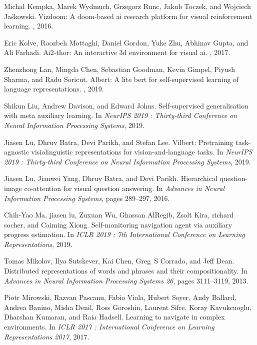 \documentclass[10pt,twocolumn,letterpaper]{article}
\begin{document}
\begin{thebibliography}{10}
	Michał {Kempka}, Marek {Wydmuch}, Grzegorz {Runc}, Jakub {Toczek}, and
	Wojciech {Jaśkowski}.
	\newblock Vizdoom: A doom-based ai research platform for visual reinforcement
	learning.
	, 2016.
	
	Eric {Kolve}, Roozbeh {Mottaghi}, Daniel {Gordon}, Yuke {Zhu}, Abhinav {Gupta},
	and Ali {Farhadi}.
	\newblock Ai2-thor: An interactive 3d environment for visual ai.
	, 2017.
	
	Zhenzhong {Lan}, Mingda {Chen}, Sebastian {Goodman}, Kevin {Gimpel}, Piyush
	{Sharma}, and Radu {Soricut}.
	\newblock Albert: A lite bert for self-supervised learning of language
	representations.
	, 2019.
	
	Shikun {Liu}, Andrew {Davison}, and Edward {Johns}.
	\newblock Self-supervised generalisation with meta auxiliary learning.
	\newblock In {\em NeurIPS 2019 : Thirty-third Conference on Neural Information
		Processing Systems}, 2019.
	
	Jiasen {Lu}, Dhruv {Batra}, Devi {Parikh}, and Stefan {Lee}.
	\newblock Vilbert: Pretraining task-agnostic visiolinguistic representations
	for vision-and-language tasks.
	\newblock In {\em NeurIPS 2019 : Thirty-third Conference on Neural Information
		Processing Systems}, 2019.
	
	Jiasen {Lu}, Jianwei {Yang}, Dhruv {Batra}, and Devi {Parikh}.
	\newblock Hierarchical question-image co-attention for visual question
	answering.
	\newblock In {\em Advances in Neural Information Processing Systems}, pages
	289--297, 2016.
	
	Chih-Yao {Ma}, jiasen {lu}, Zuxuan {Wu}, Ghassan {AlRegib}, Zsolt {Kira},
	richard {socher}, and Caiming {Xiong}.
	\newblock Self-monitoring navigation agent via auxiliary progress estimation.
	\newblock In {\em ICLR 2019 : 7th International Conference on Learning
		Representations}, 2019.
	
	Tomas {Mikolov}, Ilya {Sutskever}, Kai {Chen}, Greg~S {Corrado}, and Jeff
	{Dean}.
	\newblock Distributed representations of words and phrases and their
	compositionality.
	\newblock In {\em Advances in Neural Information Processing Systems 26}, pages
	3111--3119, 2013.
	
	Piotr {Mirowski}, Razvan {Pascanu}, Fabio {Viola}, Hubert {Soyer}, Andy
	{Ballard}, Andrea {Banino}, Misha {Denil}, Ross {Goroshin}, Laurent {Sifre},
	Koray {Kavukcuoglu}, Dharshan {Kumaran}, and Raia {Hadsell}.
	\newblock Learning to navigate in complex environments.
	\newblock In {\em ICLR 2017 : International Conference on Learning
		Representations 2017}, 2017.
	

\end{thebibliography}
\end{document}
